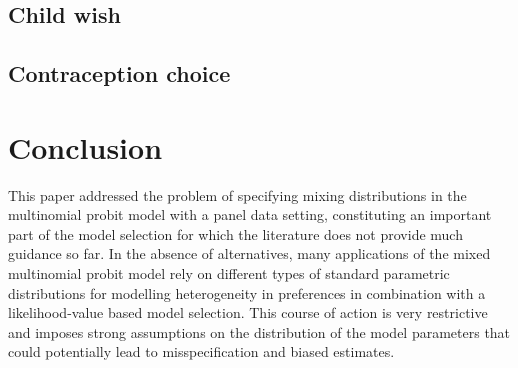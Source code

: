 \documentclass[article]{jss}
\begin{document}
\subsection{Child wish} \label{subsec:child_wish}

\subsection{Contraception choice} \label{subsec:contraception_choice}


\section{Conclusion} \label{sec:conclusion}

This paper addressed the problem of specifying mixing distributions in the multinomial probit model with a panel data setting, constituting an important part of the model selection for which the literature does not provide much guidance so far. In the absence of alternatives, many applications of the mixed multinomial probit model rely on different types of standard parametric distributions for modelling heterogeneity in preferences in combination with a likelihood-value based model selection. This course of action is very restrictive and imposes strong assumptions on the distribution of the model parameters that could potentially lead to misspecification and biased estimates.
\end{document}
